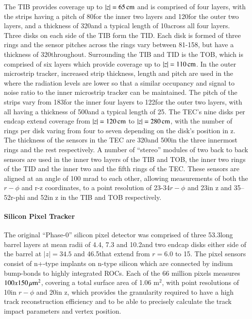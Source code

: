 The TIB provides coverage up to $|z| = 65\,\text{cm}$ and is comprised of four layers, with the strips having a pitch of 80\mum for the inner two layers and 120\mum for the outer two layers, and a thickness of 320\mum and a typical length of 10\cm across all four layers.
Three disks on each side of the TIB form the TID. 
Each disk is formed of three rings and the sensor pitches across the rings vary between 81-158\mum, but have a thickness of 320\mum throughout.
Surrounding the TIB and TID is the TOB,	which is comprised of six layers which provide coverage up to $|z| = 110\,\text{cm}$.
In the outer microstrip tracker, increased strip thickness, length and pitch are used in the where the radiation levels are lower so that a similar occupancy and signal to noise ratio to the inner microstrip tracker can be maintained.
The pitch of the strips vary from 183\mum for the inner four layers to 122\mum for the outer two layers, with all having a thickness of 500\mum and a typical length of 25\cm. 
The TEC's nine disks per endcap extend coverage from $|z| = 120\,\text{cm}$ to $|z| = 280\,\text{cm}$, with the number of rings per disk varing from four to seven depending on the disk's position in z.
The thickness of the sensors in the TEC are 320\mum and 500\mum in the three innermost rings and the rest respectively.
A number of ``stereo'' modules of two back to back sensors are used in the inner two layers of the TIB and TOB, the inner two rings of the TID and the inner two and the fifth rings of the TEC.
These sensors are aligned at an angle of 100 mrad to each other, allowing measurements of both the $r-\phi$ and r-z coordinates, to a point resolution of 23-34\mum $r-\phi$ and 23\mum in z and 35–52\mum r-phi and 52\mum in z in the TIB and TOB respectively.


\paragraph{Silicon Pixel Tracker}
The original ``Phase-0'' silicon pixel detector was comprised of three 53.3\cm long barrel layers at mean radii of 4.4, 7.3 and 10.2\cm and two endcap disks either side of the barrel at $|z| = 34.5$ and 46.5\cm that extend from $r = 6.0$ to 15\cm.
The pixel sensors consist of n+-type implants on n-type silicon which are connected by indium bump-bonds to highly integrated ROCs.
Each of the 66 million pixels measures $100x150\,\mu\text{m}^{2}$, covering a total surface area of 1.06 m$^{2}$, with point resolutions of 10\mum in $r-\phi$ and 20\mum in z, which provides the granularity required to have a high track reconstruction efficiency and to be able to precisely calculate the track impact parameters and vertex position.

